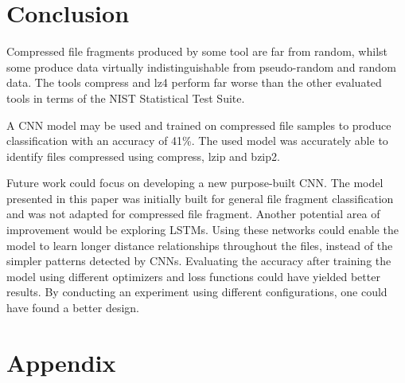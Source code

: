 \documentclass[conference]{IEEEtran}
\begin{document}
\section{Conclusion}

Compressed file fragments produced by some tool are far from random, whilst some produce data virtually indistinguishable from pseudo-random and random data. The tools compress and lz4 perform far worse than the other evaluated tools in terms of the NIST Statistical Test Suite.

A CNN model may be used and trained on compressed file samples to produce classification with an accuracy of 41\%. The used model was accurately able to identify files compressed using compress, lzip and bzip2.

Future work could focus on developing a new purpose-built CNN. The model presented in this paper was initially built for general file fragment classification and was not adapted for compressed file fragment\cite{chen2018}. Another potential area of improvement would be exploring LSTMs. Using these networks could enable the model to learn longer distance relationships throughout the files, instead of the simpler patterns detected by CNNs\cite{LE2018S118}. Evaluating the accuracy after training the model using different optimizers and loss functions could have yielded better results. By conducting an experiment using different configurations, one could have found a better design.

\newpage



\newpage
\onecolumn
\section*{Appendix}
\end{document}
